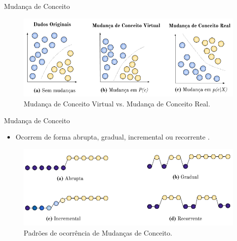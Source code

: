 \documentclass[10pt]{beamer}
\begin{document}
\begin{frame}{Mudança de Conceito}
\begin{figure}[H]
    \begin{center}
        \includegraphics[scale=0.55]{imagens/concept_drift.png}
        \caption{Mudança de Conceito Virtual vs. Mudança de Conceito Real.}
        \label{fig:real_and_virtual_concept_drift}
    \end{center}
\end{figure}
\end{frame}

\begin{frame}{Mudança de Conceito}
    \begin{itemize}
        \item<1 -> Ocorrem de forma \alert{abrupta}, \alert{gradual}, \alert{incremental} ou \alert{recorrente} \cite{Zliobaite:2010}.
    \end{itemize}
    \begin{figure}[H]
        \begin{center}
            \includegraphics[scale=0.55]{imagens/concept_drift_patterns.png}
            \caption{Padrões de ocorrência de Mudanças de Conceito.}
            \label{fig:concept_drift_patterns}
        \end{center}
    \end{figure}
\end{frame}
\end{document}
